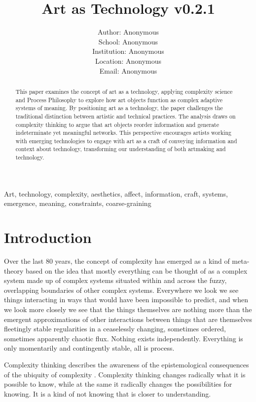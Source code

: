 \documentclass[letterpaper]{article}
\title{Art as Technology v0.2.1}
\author{Author: Anonymous\\
School: Anonymous\\
Institution: Anonymous\\
Location: Anonymous\\
Email: Anonymous\\
\newline
\newline
}
\begin{document}
 
\maketitle
\begin{abstract}

    This paper examines the concept of art as a technology, applying complexity science and Process Philosophy to explore how art objects function as complex adaptive systems of meaning. By positioning art as a technology, the paper challenges the traditional distinction between artistic and technical practices. The analysis draws on complexity thinking to argue that art objects reorder information and generate indeterminate yet meaningful networks. This perspective encourages artists working with emerging technologies to engage with art as a craft of conveying information and context about technology, transforming our understanding of both artmaking and technology.

\end{abstract}


Art, technology, complexity, aesthetics, affect, information, craft, systems, emergence, meaning, constraints, coarse-graining

\section{Introduction}

    Over the last 80 years, the concept of complexity has emerged as a kind of meta-theory based on the idea that mostly everything can be thought of as a complex system made up of complex systems situated within and across the fuzzy, overlapping boundaries of other complex systems. Everywhere we look we see things interacting in ways that would have been impossible to predict, and when we look more closely we see that the things themselves are nothing more than the emergent approximations of other interactions between things that are themselves fleetingly stable regularities in a ceaselessly changing, sometimes ordered, sometimes apparently chaotic flux. Nothing exists independently. Everything is only momentarily and contingently stable, all is process.
    
    Complexity thinking describes the awareness of the epistemological consequences of the ubiquity of complexity \citep{CilliersRichardsonCmplxtyScnc2001}. Complexity thinking changes radically what it is possible to know, while at the same it radically changes the possibilities for knowing. It is a kind of not knowing that is closer to understanding.
    
\end{document}
